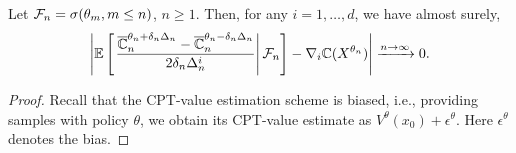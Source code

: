\begin{lemma}
\label{lemma:1spsa-bias}
Let $\mathcal{F}_n = \sigma(\theta_m,m\le n)$, $n\ge 1$.
Then, for any $i = 1,\ldots,d$, we have almost surely,  
\begin{align*}
\left| \mathbb{E}\left[\left.\dfrac{\overline {\mathbb{C}}_n^{\theta_n+\delta_n \Delta_n} -\overline {\mathbb{C}}_n^{\theta_n-\delta_n \Delta_n}}{2 \delta_n \Delta_n^{i}}\right| \mathcal{F}_n \right] - \nabla_i \mathbb{C}(X^{\theta_n}) \right| \xrightarrow{n \rightarrow\infty} 0.
\end{align*} 
\end{lemma}
\begin{proof}
Recall that the CPT-value estimation scheme is biased, i.e., providing samples with policy $\theta$, we obtain its CPT-value estimate as $V^{\theta}(x_0) + \epsilon^\theta$. Here $\epsilon^\theta$ denotes the bias. 


\end{proof}
